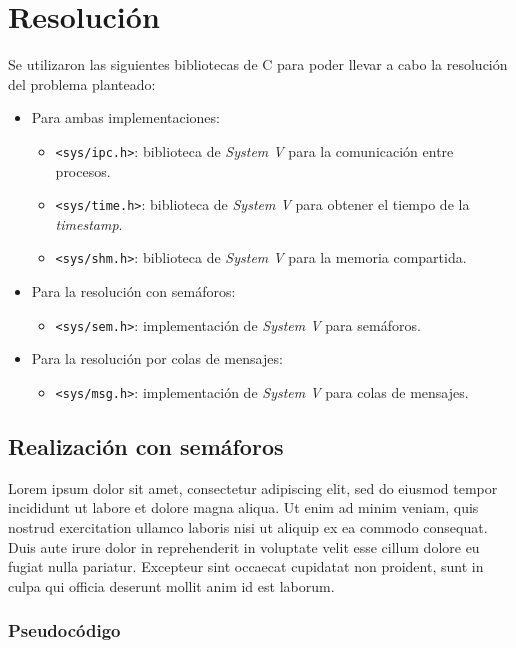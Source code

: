 \section{Resolución}

Se utilizaron las siguientes bibliotecas de C para poder llevar a cabo la resolución del problema planteado:
\begin{itemize}
    \item Para ambas implementaciones:
    \begin{itemize}
        \item \texttt{<sys/ipc.h>}: biblioteca de \textit{System V} para la comunicación entre procesos.
        \item \texttt{<sys/time.h>}: biblioteca de \textit{System V} para obtener el tiempo de la \textit{timestamp}.
        \item \texttt{<sys/shm.h>}: biblioteca de \textit{System V} para la memoria compartida.
    \end{itemize}
    \item Para la resolución con semáforos:
    \begin{itemize}
        \item \texttt{<sys/sem.h>}: implementación de \textit{System V} para semáforos.
    \end{itemize}
    \item Para la resolución por colas de mensajes:
    \begin{itemize}
        \item \texttt{<sys/msg.h>}: implementación de \textit{System V} para colas de mensajes.
    \end{itemize}
\end{itemize}

\subsection{Realización con semáforos}

Lorem ipsum dolor sit amet, consectetur adipiscing elit, sed do eiusmod tempor incididunt ut labore et dolore magna aliqua. Ut enim ad minim veniam, quis nostrud exercitation ullamco laboris nisi ut aliquip ex ea commodo consequat. Duis aute irure dolor in reprehenderit in voluptate velit esse cillum dolore eu fugiat nulla pariatur. Excepteur sint occaecat cupidatat non proident, sunt in culpa qui officia deserunt mollit anim id est laborum.

\subsubsection{Pseudocódigo}

